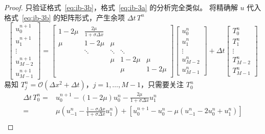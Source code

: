 \begin{proof}
    只验证格式~\eqref{eq:ib-3b}，格式~\eqref{eq:ib-3a} 的分析完全类似。
    将精确解 $u$ 代入格式~\eqref{eq:ib-3b} 的矩阵形式，产生余项 $\Delta t \,T^n$
    \[
        \begin{bmatrix}
            u_0^{n+1} \\ u_1^{n+1} \\ \vdots \\ u_{M-2}^{n+1} \\ u_{M-1}^{n+1}
        \end{bmatrix}
        =
        \begin{bmatrix}
            1-2\mu & \frac{2\mu}{1+\sigma \Delta x} &        &        &        \\
            \mu    & 1-2\mu                         & \mu    &        &        \\
                   & \ddots                         & \ddots & \ddots &        \\
                   &                                & \mu    & 1-2\mu & \mu    \\
                   &                                &        & \mu    & 1-2\mu \\
        \end{bmatrix}
        \begin{bmatrix}
            u_0^{n} \\ u_1^{n} \\ \vdots \\ u_{M-2}^{n} \\ u_{M-1}^{n}
        \end{bmatrix}
        +
        \Delta t
        \begin{bmatrix}
            T_0^{n} \\ T_1^{n} \\ \vdots \\ T_{M-2}^{n} \\ T_{M-1}^{n}
        \end{bmatrix}
    \]
    易知 $T_j^{n} = \mathcal{O}(\Delta x^2 + \Delta t)$，$j=1,\dots,M-1$，只需要关注 $T_0^{n}$
    \begin{align*}
        \Delta t\, T_0^{n} ={} & u_0^{n+1} - (1-2\mu) u_0^n - \frac{2\mu}{1+\sigma \Delta x} u_1^n            \\
        ={}                    & \mu\left(u_{-1}^n - \frac{1-\sigma \Delta x}{1+\sigma \Delta x} u_1^n\right)
        + \left[
        u_0^{n+1} - u_0^n - \mu(u_{-1}^n - 2 u_0^n + u_1^n)
        \right]                                                                                               \\

\end{align*}
\end{proof}
